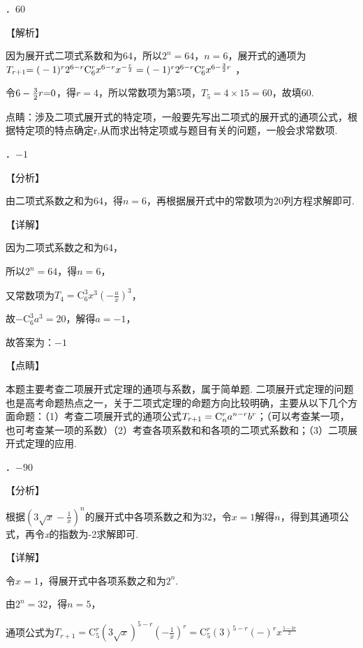 ．60

\noindent 【解析】

\noindent 因为展开式二项式系数和为64，所以$2^{n} =64$，$n=6$，展开式的通项为$T_{r{\rm +}1} {\rm =(}-1)^{r} {\rm 2}^{6-r} \mathrm C_{6}^{r} x^{6-r} x^{-\frac{r}{2} } ={\rm (}-1)^{r} {\rm 2}^{6-r} \mathrm C_{6}^{r} x^{6-\frac{3}{2} r} $ ，

\noindent 令$6-\frac{3}{2} r{\rm =}0$，得$r=4$，所以常数项为第5项，$T_{5} =4\times 15=60$，故填$60$.   $ $ 

\noindent 点睛：涉及二项式展开式的特定项，一般要先写出二项式的展开式的通项公式，根据特定项的特点确定r,从而求出特定项或与题目有关的问题，一般会求常数项.

．$-1$

\noindent 【分析】

\noindent 由二项式系数之和为64，得$n=6$，再根据展开式中的常数项为20列方程求解即可.

\noindent 【详解】

\noindent 因为二项式系数之和为64，

\noindent 所以$2^{n} =64$，得$n=6$，

\noindent 又常数项为$T_{4} =\mathrm C_{6}^{3} x^{3} \left(-\frac{a}{x} \right)^{3} $，

\noindent 故$-\mathrm C_{6}^{3} a^{3} =20$，解得$a=-1$，

\noindent 故答案为：$-1$

\noindent 【点睛】

\noindent 本题主要考查二项展开式定理的通项与系数，属于简单题. 二项展开式定理的问题也是高考命题热点之一，关于二项式定理的命题方向比较明确，主要从以下几个方面命题：（1）考查二项展开式的通项公式$T_{r+1} ={\rm C}_{n}^{r} a^{n-r} b^{r} $；（可以考查某一项，也可考查某一项的系数）（2）考查各项系数和和各项的二项式系数和；（3）二项展开式定理的应用.

．$-90$

\noindent 【分析】

\noindent 根据$\left(3\sqrt{x} -\frac{1}{x} \right)^{n} $的展开式中各项系数之和为$32$，令$x=1$解得$n$，得到其通项公式，再令\textit{x}的指数为-2求解即可.

\noindent 【详解】

\noindent 令$x=1$，得展开式中各项系数之和为$2^{n} $.

\noindent 由$2^{n} =32$，得$n=5$，

\noindent 通项公式为$T_{r+1} =\mathrm C_{5}^{r} \left(3\sqrt{x} \right)^{5-r} \left(-\frac{1}{x} \right)^{r} =\mathrm C_{5}^{r} \left(3\right)^{5-r} \left(-\right)^{r} x^{\frac{5-3r}{2} } $


